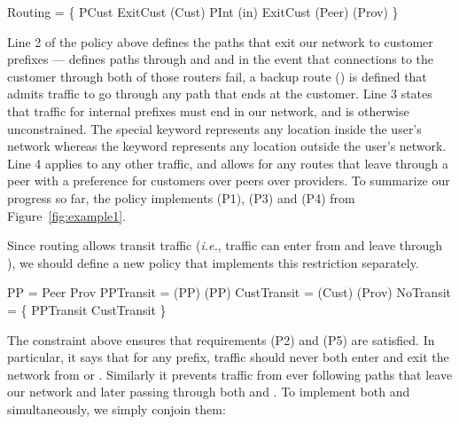 \begin{code}
\Define Routing = \{
     PCust \Path ExitCust \Prefer \End(Cust)
     PInt  \Path \End(in)
     \True  \Path ExitCust \Prefer \Exit(Peer) \Prefer \Exit(Prov)
\}
\end{code}
\noindent
Line 2 of the policy above
defines the paths that exit our network to customer prefixes ---
 defines paths through  and  and in the event
that connections to the customer through both of those routers fail,
a backup route () is defined that admits traffic to go through
any path that ends at the customer.
Line 3 states that traffic for internal prefixes must end in our network, and is otherwise unconstrained.  The special keyword \In{} represents any location
inside the user's network whereas the keyword \Out{} represents any location
outside the user's network.
Line 4 applies to any other traffic, and allows for any routes that leave through a peer with a preference for customers over peers over providers. To summarize our progress so far, the  policy
implements (P1), (P3) and (P4) from Figure~\ref{fig:example1}.

Since routing allows transit traffic (\emph{i.e.}, traffic can enter from 
 and leave through ), we should define a new policy that
implements this restriction separately.


\begin{code}
\Define PP = Peer \OR Prov
\Define PPTransit   = \Enter(PP) \AND \Exit(PP)
\Define CustTransit = \Later(Cust) \AND \Later(Prov)
\Define NoTransit   = \{
    \True \Path \NOT{}PPTransit \AND \NOT{}CustTransit
\}
\end{code}
\noindent
The  constraint above ensures that requirements (P2) and (P5) are satisfied. In particular, it says that for any prefix, traffic should never both enter and exit the network from  or . Similarly it prevents traffic from ever following paths that leave our network and later passing through both  and .  To implement both 
and  simultaneously, we simply conjoin them:

